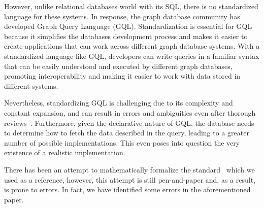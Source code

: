 \documentclass[14pt]{constructor-thesis}
\theoremstyle{definition}
\begin{document}
However, unlike relational databases world with its SQL, there is no standardized language for these systems. In response, the graph database community has developed Graph Query Language (GQL). Standardization is essential for GQL because it simplifies the databases development process and makes it easier to create applications that can work across different graph database systems. With a standardized language like GQL, developers can write queries in a familiar syntax that can be easily understood and executed by different graph databases, promoting interoperability and making it easier to work with data stored in different systems.

Nevertheless, standardizing GQL is challenging due to its complexity and constant expansion, and can result in errors and ambiguities even after thorough reviews~\cite{cpp-std-verified}. Furthermore, given the declarative nature of GQL, the database needs to determine how to fetch the data described in the query, leading to a greater number of possible implementations. This even poses into question the very existence of a realistic implementation.

There has been an attempt to mathematically formalize the standard~\cite{GQL-formalized-on-paper} which we used as a reference, however, this attempt is still pen-and-paper and, as a result, is prone to errors. In fact, we have identified some errors in the aforementioned paper.



\end{document}
